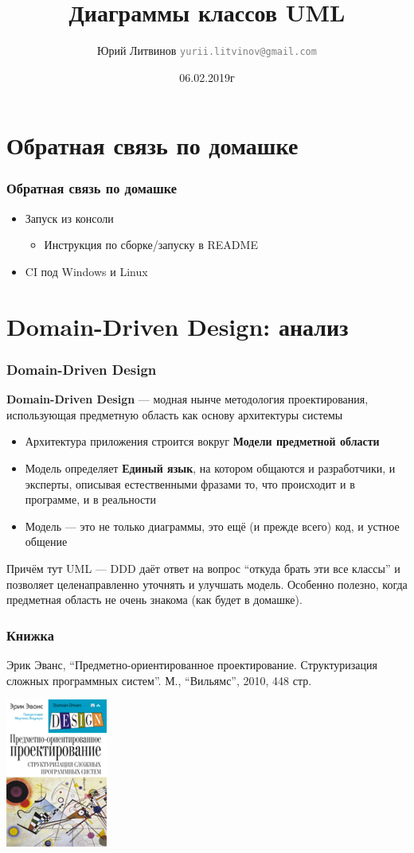 \documentclass[xetex,mathserif,serif]{beamer}
\title{Диаграммы классов UML}
\author[Юрий Литвинов]{Юрий Литвинов \newline \textcolor{gray}{\small\texttt{yurii.litvinov@gmail.com}}}
\date{06.02.2019г}
\begin{document}
	
	\frame{\titlepage}

	\section{Обратная связь по домашке}

	\begin{frame}
		\frametitle{Обратная связь по домашке}
		\begin{itemize}
			\item Запуск из консоли
			\begin{itemize}
				\item Инструкция по сборке/запуску в README
			\end{itemize}
			\item CI под Windows и Linux
		\end{itemize}
	\end{frame}

	\section{Domain-Driven Design: анализ}

	\begin{frame}
		\frametitle{Domain-Driven Design}
		\textbf{Domain-Driven Design} --- модная нынче методология проектирования, использующая предметную область как основу архитектуры системы
		\begin{itemize}
			\item Архитектура приложения строится вокруг \textbf{Модели предметной области}
			\item Модель определяет \textbf{Единый язык}, на котором общаются и разработчики, и эксперты, описывая естественными фразами то, что происходит и в программе, и в реальности
			\item Модель --- это не только диаграммы, это ещё (и прежде всего) код, и устное общение
		\end{itemize}
		Причём тут UML --- DDD даёт ответ на вопрос ``откуда брать эти все классы'' и позволяет целенаправленно уточнять и улучшать модель. 
		Особенно полезно, когда предметная область не очень знакома (как будет в домашке).
	\end{frame}

	\begin{frame}
		\frametitle{Книжка}
		Эрик Эванс, ``Предметно-ориентированное проектирование. Структуризация сложных программных систем''. М., ``Вильямс'', 2010, 448 стр.
		\begin{center}
			\includegraphics[width=0.25\textwidth]{dddCover.jpg}
		\end{center}
	\end{frame}
\end{document}
